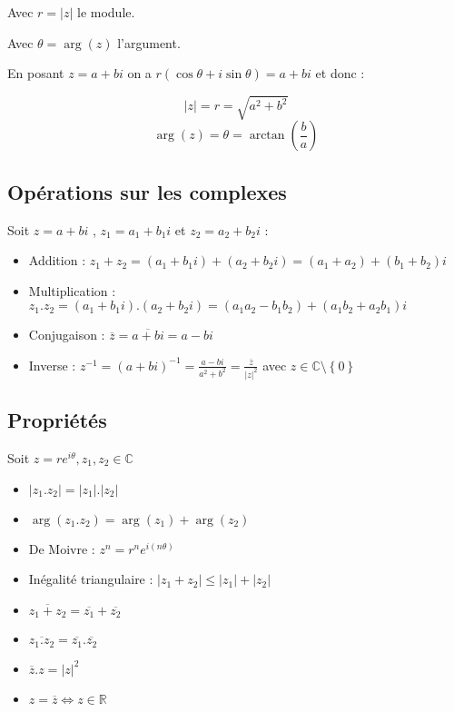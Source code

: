 \documentclass[a4paper,10pt]{report}
\newcommand{\conj}[1]{\overline{#1}}
\newcommand{\R}{\mathbb{R}}
\newcommand{\C}{\mathbb{C}}
\newcommand{\ioi}{\Leftrightarrow}
\newcommand{\tset}[1]{\left\lbrace #1 \right\rbrace}
\newcommand{\abs}[1]{\left\vert #1 \right\vert}
\begin{document}
Avec $r = \abs{z}$ le module.

Avec $\theta = \arg (z)$ l'argument.

En posant $z = a + bi$ on a $r(\cos \theta + i \sin \theta) = a + bi$ et donc :

\[ \abs{z} = r = \sqrt{a^2+b^2} \]
\[ \arg(z) = \theta = \arctan \left( \frac{b}{a} \right) \]

\subsection{Opérations sur les complexes}

Soit $z = a + bi$ , $z_1 = a_1+ b_1 i$ et $z_2 = a_2 + b_2 i$ :

\begin{itemize}
\item{Addition : $z_1 + z_2 = (a_1 + b_1 i) + (a_2 + b_2 i) = (a_1 + a_2) + (b_1 + b_2)i$}
\item{Multiplication : $z_1 . z_2 = (a_1 + b_1i) . (a_2 + b_2 i) = (a_1a_2 - b_1b_2) + (a_1b_2 + a_2b_1)i$}
\item{Conjugaison : $\conj{z} = \conj{a+bi} = a - bi$}
\item{Inverse : $z^{-1} = \left(a+bi\right)^{-1} = \frac{a-bi}{a^2+b^2} = \frac{\conj{z}}{\abs{z}^2}$ avec $z \in \C\setminus \tset{0}$}
\end{itemize}

\subsection{Propriétés}

Soit $z = r e^{i \theta}, z_1, z_2 \in \C$

\begin{itemize}
\item{$\abs{z_1.z_2} = \abs{z_1}.\abs{z_2}$}
\item{$\arg(z_1.z_2) = \arg(z_1)+\arg(z_2)$}
\item{De Moivre : $z^n = r^n e^{i (n \theta)}$}
\item{Inégalité triangulaire : $\abs{z_1 + z_2} \leq \abs{z_1} + \abs{z_2}$}
\item{$\conj{z_1 + z_2} = \conj{z_1} + \conj{z_2}$}
\item{$\conj{z_1 . z_2} = \conj{z_1} . \conj{z_2}$}
\item{$\conj{z}.z = \abs{z}^2$}
\item{$z = \conj{z} \ioi z \in \R$}
\end{itemize}
\end{document}
